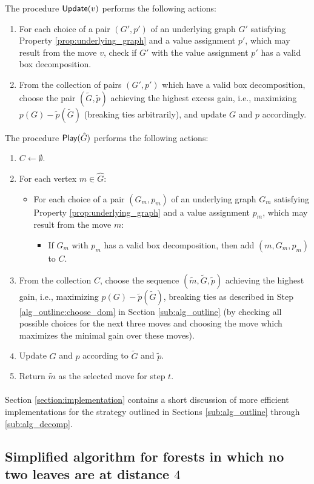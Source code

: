 \documentclass[11pt]{article}
\def\dnsitem{\vspace{-7pt}\item}
\def\dnssubitem{\vspace{-5pt}\item}
\theoremstyle{definition}
\def\play{\mbox{\sf Play}}
\def\update{\mbox{\sf Update}}
\begin{document}
The procedure $\update(v)$ performs the following actions:
\begin{enumerate}
	\dnsitem For each choice of a pair $(G', p')$ of an underlying graph $G'$ satisfying Property \ref{prop:underlying_graph} and a value assignment $p'$, 
	which may result from the move $v$,
	check if $G'$ with the value assignment $p'$ has a valid box decomposition.
	\dnsitem From the collection of pairs $(G', p')$ which have a valid box decomposition,
	choose the pair $(\widetilde{G}, \tilde{p})$ achieving the highest excess gain, i.e., maximizing $p(G) - \tilde{p}(\widetilde{G})$ (breaking ties arbitrarily),
	and update $G$ and $p$ accordingly.
\end{enumerate}

The procedure $\play(\hat{G})$ performs the following actions:
\begin{enumerate}
	\dnsitem $C \leftarrow \emptyset$.
	\dnsitem For each vertex $m \in \hat{G}$:
	\begin{itemize}
		\dnsitem[] For each choice of a pair $(G_m, p_m)$ of an underlying graph $G_m$ satisfying Property \ref{prop:underlying_graph} and a value assignment $p_m$, 
		which may result from the move $m$:
		\begin{itemize}
			\dnssubitem[] If $G_m$ with $p_m$ has a valid box decomposition,
			then add $(m, G_m, p_m)$ to $C$.
		\end{itemize}
	\end{itemize}
	\dnsitem From the collection $C$, 
	choose the sequence $(\widetilde{m}, \widetilde{G}, \tilde{p})$ achieving the highest gain, i.e., maximizing $p(G) - \tilde{p}(\widetilde{G})$, breaking ties as described in Step \ref{alg_outline:choose_dom} in Section \ref{sub:alg_outline} (by checking all possible choices for the next three moves and choosing the move which maximizes the minimal gain over these moves).
	\dnsitem Update $G$ and $p$ according to $\widetilde{G}$ and $\tilde{p}$.
	\dnsitem Return $\widetilde{m}$ as the selected move for step $t$.
\end{enumerate}

\paragraph{}
Section \ref{section:implementation} contains a short discussion of more efficient implementations for the strategy outlined in Sections \ref{sub:alg_outline} through \ref{sub:alg_decomp}.



\subsection{Simplified algorithm for forests in which no two leaves are at distance $4$}
\label{sub:simplified_alg_no_distance_4}
\end{document}
